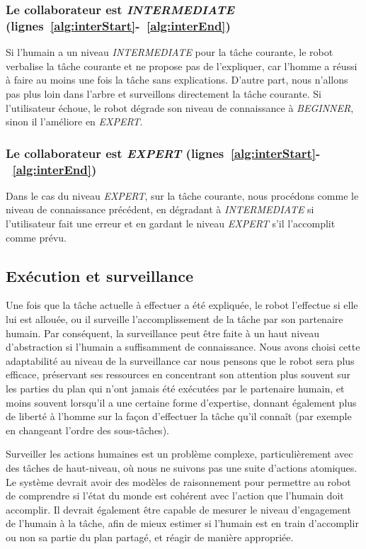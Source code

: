 \documentclass[a4paper,11pt,twoside]{StyleThese}
\begin{document}
\subsubsection{Le collaborateur est \textit{INTERMEDIATE} (lignes~\ref{alg:interStart}-~\ref{alg:interEnd})} Si l'humain a un niveau  \textit{INTERMEDIATE} pour la tâche courante, le robot verbalise la tâche courante et ne propose pas de l'expliquer, car l'homme a réussi à faire au moins une fois la tâche sans explications. D'autre part, nous n'allons pas plus loin dans l'arbre et surveillons directement la tâche courante. Si l'utilisateur échoue, le robot dégrade son niveau de connaissance à \textit{BEGINNER}, sinon il l'améliore en \textit{EXPERT}.

\subsubsection{Le collaborateur est \textit{EXPERT} (lignes~\ref{alg:interStart}-~\ref{alg:interEnd})} Dans le cas du niveau \textit{EXPERT}, sur la tâche courante, nous procédons comme le niveau de connaissance précédent, en dégradant à \textit{INTERMEDIATE} si l'utilisateur fait une erreur et en gardant le niveau \textit{EXPERT} s'il l'accomplit comme prévu.

\subsection{Exécution et surveillance}
Une fois que la tâche actuelle à effectuer a été expliquée, le robot l'effectue si elle lui est allouée, ou il surveille l'accomplissement de la tâche par son partenaire humain. Par conséquent, la surveillance peut être faite à un haut niveau d'abstraction si l'humain a suffisamment de connaissance.
Nous avons choisi cette adaptabilité au niveau de la surveillance car nous pensons que le robot sera plus efficace, préservant ses ressources en concentrant son attention plus souvent sur les parties du plan qui n'ont jamais été exécutées par le partenaire humain, et moins souvent lorsqu'il a une certaine forme d'expertise, donnant également plus de liberté à l'homme sur la façon d'effectuer la tâche qu'il connaît (par exemple en changeant l'ordre des sous-tâches).

Surveiller les actions humaines est un problème complexe, particulièrement avec des tâches de haut-niveau, où nous ne suivons pas une suite d'actions atomiques. Le système devrait avoir des modèles de raisonnement pour permettre au robot de comprendre si l'état du monde est cohérent avec l'action que l'humain doit accomplir. Il devrait également être capable de mesurer le niveau d'engagement de l'humain à la tâche, afin de mieux estimer si l'humain est en train d'accomplir ou non sa partie du plan partagé, et réagir de manière appropriée.
\end{document}
